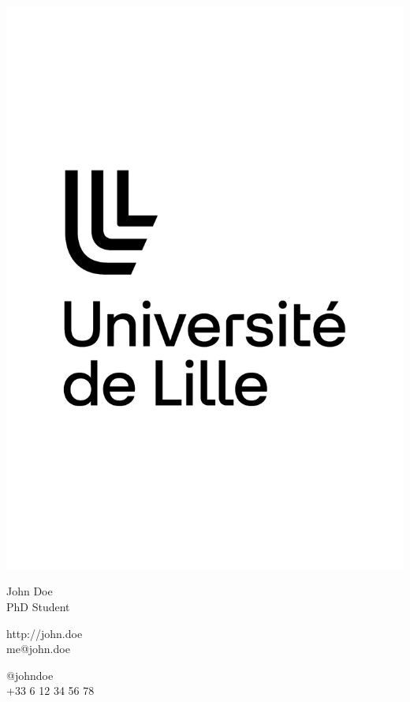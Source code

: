 \documentclass{article}
\begin{document}
\centering \includegraphics[width=.25\linewidth]{logo}\\[5pt]
\parbox{2in}{\Large \centering John Doe\\[1pt]
\normalsize PhD Student}

\vfill
\raggedright
\begin{multicols}{2}
http://john.doe\\
me@john.doe

\columnbreak
\raggedleft
@johndoe\\
+33 6 12 34 56 78%
\end{multicols}%
\end{document}

